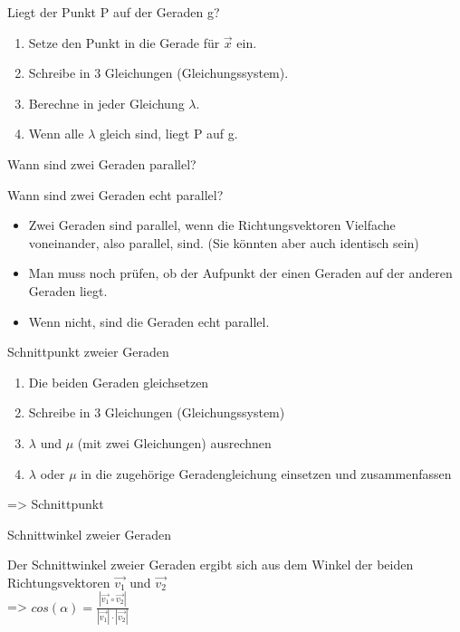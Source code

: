 \documentclass[paper=a6,landscape,ngerman,twoside=true,fontsize=12pt]{scrartcl}
\begin{document}
\begin{frage}
	\LARGE
	Liegt der Punkt P auf der Geraden g?
	
\end{frage}
\begin{antwort}
	\Large	
	\begin{enumerate} 
		\item Setze den Punkt in die Gerade für $\vec{x}$ ein.	
		\item Schreibe in 3 Gleichungen (Gleichungssystem).
		\item Berechne in jeder Gleichung $\lambda$.
		\item Wenn alle $\lambda$ gleich sind, liegt P auf g.
	\end{enumerate} 
		
\end{antwort}	
\begin{frage}
	\LARGE
	Wann sind zwei Geraden parallel?
	
	Wann sind zwei Geraden echt parallel?
	
\end{frage}
\begin{antwort}
	\Large	
	\begin{itemize} 
		\item Zwei Geraden sind parallel, wenn die Richtungsvektoren Vielfache voneinander, also parallel, sind.	
		(Sie könnten aber auch identisch sein)
		\item Man muss noch prüfen, ob der Aufpunkt der einen Geraden auf der anderen Geraden liegt.
		\item Wenn nicht, sind die Geraden echt parallel.
	\end{itemize} 
	
\end{antwort}	
\begin{frage}
	\LARGE
	Schnittpunkt zweier Geraden
	
\end{frage}
\begin{antwort}
	\Large	
	\begin{enumerate} 
		\item Die beiden Geraden gleichsetzen
		\item Schreibe in 3 Gleichungen (Gleichungssystem)
		\item $\lambda$ und $\mu$ (mit zwei Gleichungen) ausrechnen
		\item  $\lambda$ oder $\mu$ in die zugehörige Geradengleichung einsetzen und zusammenfassen
	\end{enumerate} 
	\bigskip
	=> Schnittpunkt
	
\end{antwort}		
\begin{frage}
	\LARGE
	Schnittwinkel zweier Geraden
	
\end{frage}
\begin{antwort}
	\Large	
		Der Schnittwinkel zweier Geraden ergibt sich aus dem Winkel der beiden Richtungsvektoren $\vec{v_1}$ und $\vec{v_2}$ \\
		=> $cos(\alpha)=\frac{|\vec{v_1} \circ \vec{v_2}|}{|\vec{v_1}|\cdot|\vec{v_2}|}$	
\end{antwort}		
\end{document}
